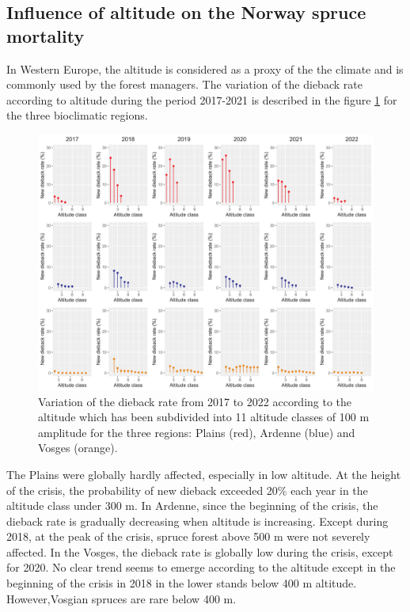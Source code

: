 \documentclass[3p,procedia]{elsarticle}
\begin{document}
\subsection{ Influence of altitude on the Norway spruce mortality}
In Western Europe, the altitude is considered as a proxy of the the climate \citep{faccoli_composition_2014} and is commonly used by the forest managers. 
The variation of the dieback rate according to altitude during the period 2017-2021 is described in the figure \ref{alti_sco} for the three bioclimatic regions.
\begin{figure}[htbp] 
\centering
	\includegraphics[width=\textwidth]{synthese_color_11_2022.png}
     \caption{Variation of the dieback rate from 2017 to 2022 according to the altitude which has been subdivided into 11 altitude classes of 100 m amplitude for the three regions: Plains (red), Ardenne (blue) and Vosges (orange). 
}
	\label{alti_sco}
\end{figure}
The Plains were globally hardly affected, especially in low altitude. At the height of the crisis, the probability of new dieback exceeded 20\% each year in the altitude class under 300 m.
In Ardenne, since the beginning of the crisis, the dieback rate is gradually decreasing when altitude is increasing.
Except during 2018, at the peak of the crisis, spruce forest above 500 m were not severely affected.
In the Vosges, the dieback rate is globally low during the crisis, except for 2020.
No clear trend seems to emerge according to the altitude except in the beginning of the crisis in 2018 in the lower stands below 400 m altitude.
However,Vosgian spruces are rare below 400 m.
\end{document}
